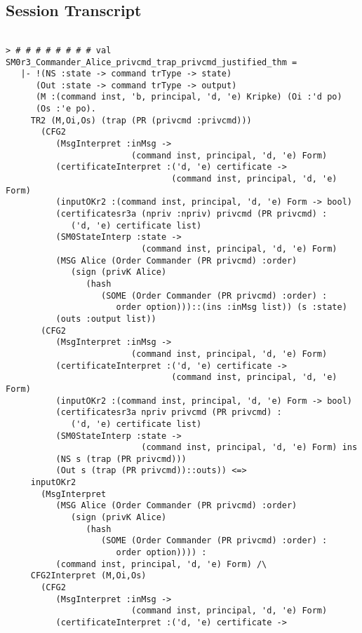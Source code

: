 \documentclass{report}
\begin{document}
\subsection{Session Transcript}
\label{trans7}
\begin{session}
  \begin{scriptsize}
\begin{verbatim}

> # # # # # # # # val SM0r3_Commander_Alice_privcmd_trap_privcmd_justified_thm =
   |- !(NS :state -> command trType -> state)
      (Out :state -> command trType -> output)
      (M :(command inst, 'b, principal, 'd, 'e) Kripke) (Oi :'d po)
      (Os :'e po).
     TR2 (M,Oi,Os) (trap (PR (privcmd :privcmd)))
       (CFG2
          (MsgInterpret :inMsg ->
                         (command inst, principal, 'd, 'e) Form)
          (certificateInterpret :('d, 'e) certificate ->
                                 (command inst, principal, 'd, 'e) Form)
          (inputOKr2 :(command inst, principal, 'd, 'e) Form -> bool)
          (certificatesr3a (npriv :npriv) privcmd (PR privcmd) :
             ('d, 'e) certificate list)
          (SM0StateInterp :state ->
                           (command inst, principal, 'd, 'e) Form)
          (MSG Alice (Order Commander (PR privcmd) :order)
             (sign (privK Alice)
                (hash
                   (SOME (Order Commander (PR privcmd) :order) :
                      order option)))::(ins :inMsg list)) (s :state)
          (outs :output list))
       (CFG2
          (MsgInterpret :inMsg ->
                         (command inst, principal, 'd, 'e) Form)
          (certificateInterpret :('d, 'e) certificate ->
                                 (command inst, principal, 'd, 'e) Form)
          (inputOKr2 :(command inst, principal, 'd, 'e) Form -> bool)
          (certificatesr3a npriv privcmd (PR privcmd) :
             ('d, 'e) certificate list)
          (SM0StateInterp :state ->
                           (command inst, principal, 'd, 'e) Form) ins
          (NS s (trap (PR privcmd)))
          (Out s (trap (PR privcmd))::outs)) <=>
     inputOKr2
       (MsgInterpret
          (MSG Alice (Order Commander (PR privcmd) :order)
             (sign (privK Alice)
                (hash
                   (SOME (Order Commander (PR privcmd) :order) :
                      order option)))) :
          (command inst, principal, 'd, 'e) Form) /\
     CFG2Interpret (M,Oi,Os)
       (CFG2
          (MsgInterpret :inMsg ->
                         (command inst, principal, 'd, 'e) Form)
          (certificateInterpret :('d, 'e) certificate ->

\end{verbatim}
\end{scriptsize}
\end{session}
\end{document}
